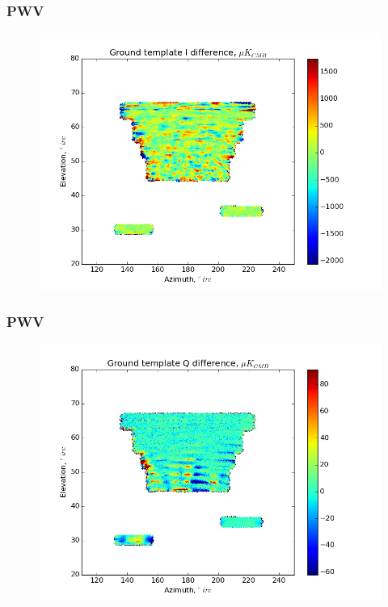 \documentclass{beamer}
\begin{document}
\begin{frame}
\frametitle{PWV}
\begin{figure}
\includegraphics[width=0.9\linewidth]{dI_gt_PWV.png}
\end{figure}
\end{frame}

\begin{frame}
\frametitle{PWV}
\begin{figure}
\includegraphics[width=0.9\linewidth]{dQ_gt_PWV.png}
\end{figure}
\end{frame}
\end{document}
